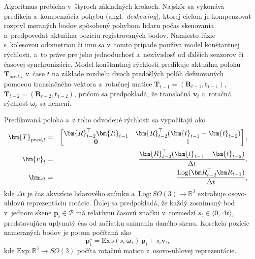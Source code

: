       Algoritmus prebieha v~štyroch základných krokoch. Najskôr sa vykonáva predikcia a~kompenzácia pohybu (angl.\ \emph{deskewing}), ktorej cieľom je kompenzovať rozptyl meraných bodov spôsobený pohybom lidaru počas skenovania a~predpovedať aktuálnu pozíciu registrovaných bodov. Namiesto fúzie s~kolesovou odometriou či \acrshort{imu} sa v~tomto prípade používa model konštantnej rýchlosti, a~to práve pre jeho jednoduchosť a~nezávislosť od ďalších senzorov či časovej synchronizácie. Model konštantnej rýchlosti predikuje aktuálnu polohu $\bm{T}_{pred,t}$ v~čase $t$ na základe rozdielu dvoch predošlých polôh definovaných pomocou translačného vektora a~rotačnej matice $\bm{T}_{t-1} = (\bm{R}_{t-1},\bm{t}_{t-1})$, $\bm{T}_{t-2} = (\bm{R}_{t-2}, \bm{t}_{t-2})$, pričom sa predpokladá, že translačná $\bm{v}_t$ a~rotačná rýchlosť $\bm{\omega}_t$ sa nemení.
      
      Predikovaná poloha a~z toho odvodené rýchlosti sa vypočítajú ako
      \begin{eqnarray}
        \bm{T}_{pred,t} &=&
        \begin{bmatrix}
          \bm{R}_{t-2}^{\top} \bm{R}_{t-1} & \bm{R}_{t-2}^{\top} (\bm{t}_{t-1} - \bm{t}_{t-2}) \\
          \bf 0 & 1
        \end{bmatrix},\\
        \bm{v}_t &=& \frac{\bm{R}_{t-2}^{\top}(\bm{t}_{t-1} - \bm{t}_{t-2})}{\Delta t}, \\
        \bm \omega_t &=& \frac{\mathrm{Log}(\bm R_{t-2}^{\top} \bm R_{t-1})}{\Delta t},
      \end{eqnarray}
      kde $\Delta t$ je čas akvizície lidarového snímku a~$\mathrm{Log}: SO(3) \rightarrow \mathbb{R}^3$ extrahuje osovo-uhlovú reprezentáciu rotácie. Ďalej sa predpokladá, že každý zosnímaný bod v~jednom skene $\bm{p_i} \in \mathcal{P}$ má relatívnu časovú značku v~rozmedzí $s_i \in \langle 0, \Delta t \rangle$, predstavujúcu uplynutý čas od začiatku snímania daného skenu. Korekcia pozície nameraných bodov je potom počítaná ako
      \begin{equation}
        \bm p_i^{\star} = \mathrm{Exp}(s_i\, \bm{\omega_t})\, \bm{p}_i + s_i \bm{v}_t,
      \end{equation}
      kde $\mathrm{Exp}: \mathbb{R}^3 \rightarrow SO(3)$ počíta rotačnú maticu z~osovo-uhlovej reprezentácie.
      
